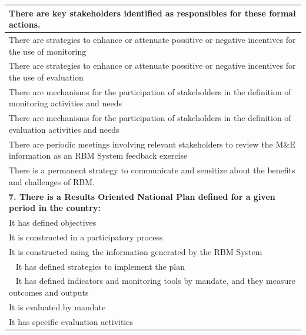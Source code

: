 \documentclass[
  10pt,
]{book}
\begin{document}
\begin{table}
\begin{tabular}[t]{l}
\hline
\hspace{1em}There are key stakeholders identified as responsibles for these formal actions.\\
\hline
\hspace{1em}There are strategies to enhance or attenuate possitive or negative incentives for the use of monitoring\\
\hline
\hspace{1em}There are strategies to enhance or attenuate possitive or negative incentives for the use of evaluation\\
\hline
\hspace{1em}There are mechanisms for the participation of stakeholders in the definition of monitoring activities and needs\\
\hline
\hspace{1em}There are mechanisms for the participation of stakeholders in the definition of evaluation activities and needs\\
\hline
There are periodic meetings involving relevant stakeholders to review the M\&E
\hspace{1em}information as an RBM System feedback exercise\\
\hline
\hspace{1em}There is a permanent strategy to communicate and sensitize about the benefits and challenges of RBM.\\
\hline
\multicolumn{1}{l}{\textbf{7. There is a Results Oriented National Plan defined for a given period in the country:}}\\
\hline
\hspace{1em}It has defined objectives\\
\hline
\hspace{1em}It is constructed in a participatory process\\
\hline
\hspace{1em}It is constructed using the information generated by the RBM System\\
\hline
\hspace{1em}  It has defined strategies to implement the plan\\
\hline
\hspace{1em}  It has defined indicators and monitoring tools by mandate, and they measure outcomes and outputs\\
\hline
\hspace{1em}It is evaluated by mandate\\
\hline
\hspace{1em}It  has specific evaluation activities\\

\end{tabular}
\end{table}
\end{document}
